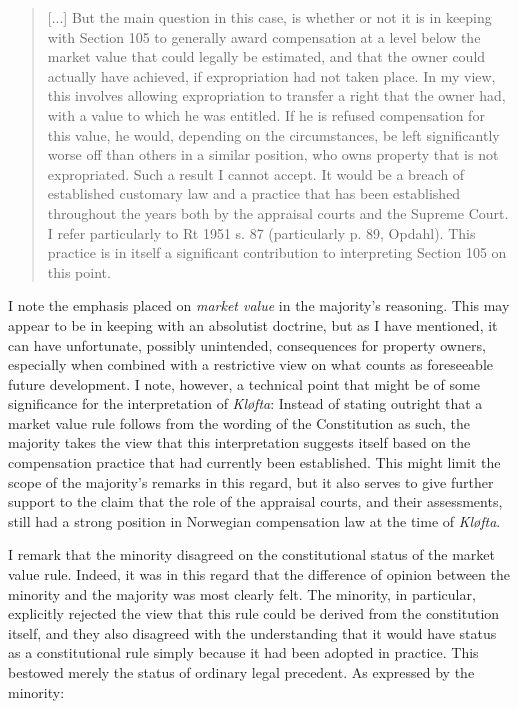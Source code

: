 \begin{quote}
[...] But the main question in this case, is whether or not it is in keeping with Section 105 to generally award compensation at a level below the market value that could legally be estimated, and that the owner could actually have achieved, if expropriation had not taken place. In my view, this involves allowing expropriation to transfer a right that the owner had, with a value to which he was entitled. If he is refused compensation for this value, he would, depending on the circumstances, be left significantly worse off than others in a similar position, who owns property that is not expropriated. Such a result I cannot accept. It would be a breach of established customary law and a practice that has been established throughout the years both by the appraisal courts and the Supreme Court. I refer particularly to Rt 1951 s. 87 (particularly p. 89, Opdahl). This practice is in itself a significant contribution to interpreting Section 105 on this point.
\end{quote}

I note the emphasis placed on \emph{market value} in the majority's reasoning. This may appear to be in keeping with an absolutist doctrine, but as I have mentioned, it can have unfortunate, possibly unintended, consequences for property owners, especially when combined with a restrictive view on what counts as foreseeable future development. I note, however, a technical point that might be of some significance for the interpretation of \emph{Kløfta}: Instead of stating outright that a market value rule follows from the wording of the Constitution as such, the majority takes the view that this interpretation suggests itself based on the compensation practice that had currently been established. This might limit the scope of the majority's remarks in this regard, but it also serves to give further support to the claim that the role of the appraisal courts, and their assessments, still had a strong position in Norwegian compensation law at the time of \emph{Kløfta}. 

I remark that the minority disagreed on the constitutional status of the market value rule. Indeed, it was in this regard that the difference of opinion between the minority and the majority was most clearly felt. The minority, in particular, explicitly rejected the view that this rule could be derived from the constitution itself, and they also disagreed with the understanding that it would have status as a constitutional rule simply because it had been adopted in practice. This bestowed merely the status of ordinary legal precedent. As expressed by the minority:


